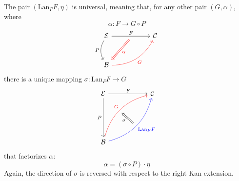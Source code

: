 \documentclass[DaoFP]{subfiles}
\begin{document}
The pair $(\text{Lan}_P F, \eta)$ is universal, meaning that, for any other pair $(G, \alpha)$, where 
\[ \alpha \colon F \to G \circ P\] 
\[
 \begin{tikzcd} [row sep=1cm, column sep=1cm]
 \cat E
 \arrow[rr, "F", "" {name=ID, below} ]
 \arrow[d, bend right, "P"']
 && \cat C
 \\
 \cat B
  \arrow[urr, red, bend right, "G"']
 \arrow[Rightarrow, red, "\alpha",  from=ID]
 \end{tikzcd}
\]
there is a unique mapping $\sigma \colon \text{Lan}_P F \to G$ 
\[
\begin{tikzcd}[row sep=2cm, column sep=2cm]
\cat E  \ar[d, "P"', "" {name=P}]
            \ar[r, "F", ""  {name=F, below, near start, bend right}]
&
\cat C
\\
\cat B
    \ar[ur, red, bend left, "G", "" {name=G, below}]
    \ar[ur, blue, bend right, "\text{Lan}_P F"', "" {name=Lan}]
\arrow[Rightarrow, "\sigma", from=Lan, to=G]
\end{tikzcd}
\]
that factorizes $\alpha$:
\[ \alpha = (\sigma \circ P) \cdot \eta \]
Again, the direction of $\sigma$ is reversed with respect to the right Kan extension.
\end{document}
